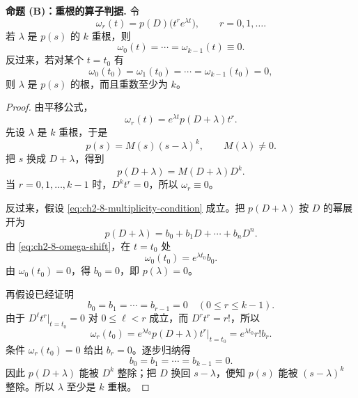 \medskip
\noindent\textbf{命题 (B)：重根的算子判据.}
令
\begin{equation}
 \omega_r(t)=p(D)\bigl(t^re^{\lambda t}\bigr),
 \qquad r=0,1,\ldots.
 \label{eq:ch2-8-omega}
\end{equation}
若 \(\lambda\) 是 \(p(s)\) 的 \(k\) 重根，则
\[
 \omega_0(t)=\cdots=\omega_{k-1}(t)\equiv0.
\]
反过来，若对某个 \(t=t_0\) 有
\begin{equation}
 \omega_0(t_0)=\omega_1(t_0)=\cdots=\omega_{k-1}(t_0)=0,
 \label{eq:ch2-8-multiplicity-condition}
\end{equation}
则 \(\lambda\) 是 \(p(s)\) 的根，而且重数至少为 \(k\)。

\begin{proof}
由平移公式，
\begin{equation}
 \omega_r(t)
 =e^{\lambda t}p(D+\lambda)t^r.
 \label{eq:ch2-8-omega-shift}
\end{equation}
先设 \(\lambda\) 是 \(k\) 重根，于是
\[
 p(s)=M(s)(s-\lambda)^k,
 \qquad M(\lambda)\ne0.
\]
把 \(s\) 换成 \(D+\lambda\)，得到
\[
 p(D+\lambda)=M(D+\lambda)D^k.
\]
当 \(r=0,1,\ldots,k-1\) 时，\(D^k t^r=0\)，所以 \(\omega_r\equiv0\)。

反过来，假设 \eqref{eq:ch2-8-multiplicity-condition} 成立。把 \(p(D+\lambda)\) 按 \(D\) 的幂展开为
\begin{equation}
 p(D+\lambda)=b_0+b_1D+\cdots+b_nD^n.
 \label{eq:ch2-8-expanded-shift}
\end{equation}
由 \eqref{eq:ch2-8-omega-shift}，在 \(t=t_0\) 处
\[
 \omega_0(t_0)=e^{\lambda t_0}b_0.
\]
由 \(\omega_0(t_0)=0\)，得 \(b_0=0\)，即 \(p(\lambda)=0\)。

再假设已经证明
\[
 b_0=b_1=\cdots=b_{r-1}=0
\quad(0\le r\le k-1).
\]
由于 \(D^\ell t^r|_{t=t_0}=0\) 对 \(0\le\ell<r\) 成立，而 \(D^rt^r=r!\)，所以
\[
 \omega_r(t_0)
 =e^{\lambda t_0}p(D+\lambda)t^r\big|_{t=t_0}
 =e^{\lambda t_0}r!b_r.
\]
条件 \(\omega_r(t_0)=0\) 给出 \(b_r=0\)。逐步归纳得
\[
 b_0=b_1=\cdots=b_{k-1}=0.
\]
因此 \(p(D+\lambda)\) 能被 \(D^k\) 整除；把 \(D\) 换回 \(s-\lambda\)，便知 \(p(s)\) 能被 \((s-\lambda)^k\) 整除。所以 \(\lambda\) 至少是 \(k\) 重根。
\end{proof}

